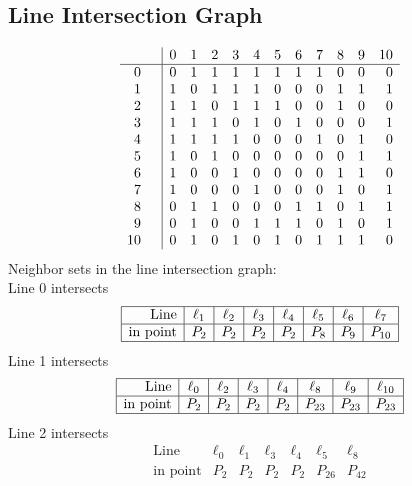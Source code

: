 \documentclass{article}
\begin{document}
{\subsection*{Line Intersection Graph}
{\arraycolsep=1pt
$$
\begin{array}{rr|*{11}r}
 &  & 0 & 1 & 2 & 3 & 4 & 5 & 6 & 7 & 8 & 9 & 10\\
\hline
0 &  & 0 & 1 & 1 & 1 & 1 & 1 & 1 & 1 & 0 & 0 & 0\\
1 &  & 1 & 0 & 1 & 1 & 1 & 0 & 0 & 0 & 1 & 1 & 1\\
2 &  & 1 & 1 & 0 & 1 & 1 & 1 & 0 & 0 & 1 & 0 & 0\\
3 &  & 1 & 1 & 1 & 0 & 1 & 0 & 1 & 0 & 0 & 0 & 1\\
4 &  & 1 & 1 & 1 & 1 & 0 & 0 & 0 & 1 & 0 & 1 & 0\\
5 &  & 1 & 0 & 1 & 0 & 0 & 0 & 0 & 0 & 0 & 1 & 1\\
6 &  & 1 & 0 & 0 & 1 & 0 & 0 & 0 & 0 & 1 & 1 & 0\\
7 &  & 1 & 0 & 0 & 0 & 1 & 0 & 0 & 0 & 1 & 0 & 1\\
8 &  & 0 & 1 & 1 & 0 & 0 & 0 & 1 & 1 & 0 & 1 & 1\\
9 &  & 0 & 1 & 0 & 0 & 1 & 1 & 1 & 0 & 1 & 0 & 1\\
10 &  & 0 & 1 & 0 & 1 & 0 & 1 & 0 & 1 & 1 & 1 & 0\\
\end{array}
$$
}%
Neighbor sets in the line intersection graph:\\
Line 0 intersects 
$$
\begin{array}{|r*{7}{|c}|}
\hline
\mbox{Line}  & \ell_{1} & \ell_{2} & \ell_{3} & \ell_{4} & \ell_{5} & \ell_{6} & \ell_{7}\\
\hline
\mbox{in point}  & P_{2} & P_{2} & P_{2} & P_{2} & P_{8} & P_{9} & P_{10}\\
\hline
\end{array}
$$
Line 1 intersects 
$$
\begin{array}{|r*{7}{|c}|}
\hline
\mbox{Line}  & \ell_{0} & \ell_{2} & \ell_{3} & \ell_{4} & \ell_{8} & \ell_{9} & \ell_{10}\\
\hline
\mbox{in point}  & P_{2} & P_{2} & P_{2} & P_{2} & P_{23} & P_{23} & P_{23}\\
\hline
\end{array}
$$
Line 2 intersects 
$$
\begin{array}{|r*{6}{|c}|}
\hline
\mbox{Line}  & \ell_{0} & \ell_{1} & \ell_{3} & \ell_{4} & \ell_{5} & \ell_{8}\\
\hline
\mbox{in point}  & P_{2} & P_{2} & P_{2} & P_{2} & P_{26} & P_{42}\\

\end{array}$$}
\end{document}
